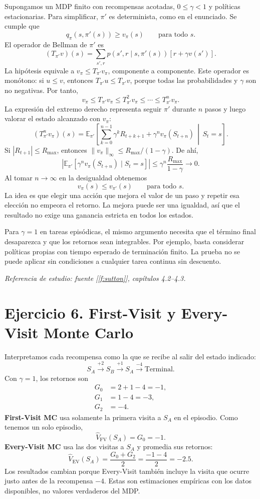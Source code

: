 \documentclass[11pt,a4paper]{article}
\newcommand{\E}{\mathbb{E}}
\begin{document}
Supongamos un MDP finito con recompensas acotadas, $0\leq\gamma<1$ y políticas estacionarias. Para simplificar, $\pi'$ es determinista, como en el enunciado. Se cumple que
\[
q_\pi(s,\pi'(s))\geq v_\pi(s)\qquad\text{para todo }s.
\]
El operador de Bellman de $\pi'$ es
\[
(T_{\pi'}v)(s)=\sum_{s',r}p(s',r\mid s,\pi'(s))[r+\gamma v(s')].
\]
La hipótesis equivale a $v_\pi\leq T_{\pi'}v_\pi$, componente a componente. Este operador es monótono: si $u\leq v$, entonces $T_{\pi'}u\leq T_{\pi'}v$, porque todas las probabilidades y $\gamma$ son no negativas. Por tanto,
\[
v_\pi\leq T_{\pi'}v_\pi\leq T_{\pi'}^2v_\pi\leq\cdots\leq T_{\pi'}^nv_\pi.
\]
La expresión del extremo derecho representa seguir $\pi'$ durante $n$ pasos y luego valorar el estado alcanzado con $v_\pi$:
\[
(T_{\pi'}^nv_\pi)(s)=\E_{\pi'}\left[
\sum_{k=0}^{n-1}\gamma^kR_{t+k+1}+\gamma^nv_\pi(S_{t+n})
\,\middle|\,S_t=s\right].
\]
Si $|R_{t+1}|\leq R_{\max}$, entonces $\|v_\pi\|_\infty\leq R_{\max}/(1-\gamma)$. De ahí,
\[
\left|\E_{\pi'}[\gamma^nv_\pi(S_{t+n})\mid S_t=s]\right|
\leq\gamma^n\frac{R_{\max}}{1-\gamma}\longrightarrow0.
\]
Al tomar $n\to\infty$ en la desigualdad obtenemos
\[
\boxed{v_\pi(s)\leq v_{\pi'}(s)\qquad\text{para todo }s.}
\]
La idea es que elegir una acción que mejora el valor de un paso y repetir esa elección no empeora el retorno. La mejora puede ser una igualdad, así que el resultado no exige una ganancia estricta en todos los estados.

Para $\gamma=1$ en tareas episódicas, el mismo argumento necesita que el término final desaparezca y que los retornos sean integrables. Por ejemplo, basta considerar políticas propias con tiempo esperado de terminación finito. La prueba no se puede aplicar sin condiciones a cualquier tarea continua sin descuento.

\textit{Referencia de estudio: fuente [\ref{f:sutton}], capítulos 4.2--4.3.}

\section{Ejercicio 6. First-Visit y Every-Visit Monte Carlo}

Interpretamos cada recompensa como la que se recibe al salir del estado indicado:
\[
S_A\xrightarrow{+2}S_B\xrightarrow{+1}S_A\xrightarrow{-4}\text{Terminal}.
\]
Con $\gamma=1$, los retornos son
\begin{align*}
G_0&=2+1-4=-1,\\
G_1&=1-4=-3,\\
G_2&=-4.
\end{align*}
\textbf{First-Visit MC} usa solamente la primera visita a $S_A$ en el episodio. Como tenemos un solo episodio,
\[
\boxed{\widehat V_{\mathrm{FV}}(S_A)=G_0=-1.}
\]
\textbf{Every-Visit MC} usa las dos visitas a $S_A$ y promedia sus retornos:
\[
\boxed{\widehat V_{\mathrm{EV}}(S_A)=\frac{G_0+G_2}{2}=\frac{-1-4}{2}=-2.5.}
\]
Los resultados cambian porque Every-Visit también incluye la visita que ocurre justo antes de la recompensa $-4$. Estas son estimaciones empíricas con los datos disponibles, no valores verdaderos del MDP.
\end{document}
